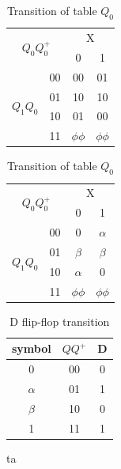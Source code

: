\documentclass[pdftex,12pt,a4paper]{article}
\begin{document}
\begin{flushleft}
\begin{table}[h]
\centering
\begin{tabular}{cc|cc}
\multicolumn{2}{c|}{\multirow{2}{*}{$Q_{0}Q^{+}_{0}$}} & \multicolumn{2}{c}{X}   \\
\multicolumn{2}{c|}{}                                  & 0          & 1          \\ \hline
\multirow{4}{*}{$Q_{1}Q_{0}$}           & 00           & 00         & 01         \\
                                        & 01           & 10         & 10         \\
                                        & 10           & 01         & 00         \\
                                        & 11           & $\phi\phi$ & $\phi\phi$
\end{tabular}
\caption{Transition of table $Q_{0}$}
\label{tab:part2_q0}
\end{table}

\end{flushleft}
\begin{table}[h]
\centering
\begin{tabular}{cc|cc}
\multicolumn{2}{c|}{\multirow{2}{*}{$Q_{0}Q^{+}_{0}$}} & \multicolumn{2}{c}{X}   \\
\multicolumn{2}{c|}{}                                  & 0          & 1          \\ \hline
\multirow{4}{*}{$Q_{1}Q_{0}$}           & 00           & 0          & $\alpha$   \\
                                        & 01           & $\beta$    & $\beta$    \\
                                        & 10           & $\alpha$   & 0          \\
                                        & 11           & $\phi\phi$ & $\phi\phi$
\end{tabular}
\caption{Transition of table $Q_{0}$}
\label{tab:part2_q1}
\end{table}


\begin{table}[h]
\centering
\begin{tabular}{cc|c}
symbol   & $QQ^{+}$ & D \\ \hline
0        & 00       & 0 \\
$\alpha$ & 01       & 1 \\
$\beta$  & 10       & 0 \\
1        & 11       & 1
\end{tabular}
\caption{D flip-flop transition}ta
\end{table}
\end{document}
